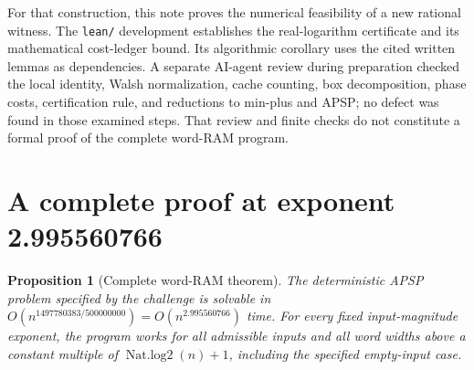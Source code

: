 \documentclass[11pt,a4paper]{article}
\newtheorem{proposition}{Proposition}
\begin{document}
For that construction, this note proves the numerical feasibility of a new
rational witness. The \texttt{lean/} development establishes the real-logarithm
certificate and its mathematical cost-ledger bound. Its algorithmic corollary
uses the cited written lemmas as dependencies.
A separate AI-agent review during preparation checked the local
identity, Walsh normalization, cache counting, box decomposition, phase
costs, certification rule, and reductions to min-plus and APSP; no defect
was found in those examined steps. That review and finite checks do not
constitute a formal proof of the complete word-RAM program.

\section{A complete proof at exponent 2.995560766}\label{sec:complete}
\begin{proposition}[Complete word-RAM theorem]
The deterministic APSP problem specified by the challenge is solvable in
$O(n^{1497780383/500000000})=O(n^{2.995560766})$ time.
For every fixed input-magnitude exponent, the program works for all
admissible inputs and all word widths above a constant multiple of
$\operatorname{Nat.log2}(n)+1$, including the specified empty-input case.
\end{proposition}
\end{document}
